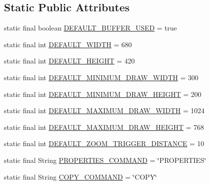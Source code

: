 \subsection*{Static Public Attributes}
\begin{DoxyCompactItemize}
\item 
static final boolean \mbox{\hyperlink{classorg_1_1jfree_1_1chart_1_1_chart_panel_a74df60f4b942e14630c514902daa1abd}{D\+E\+F\+A\+U\+L\+T\+\_\+\+B\+U\+F\+F\+E\+R\+\_\+\+U\+S\+ED}} = true
\item 
static final int \mbox{\hyperlink{classorg_1_1jfree_1_1chart_1_1_chart_panel_a5860f546e5e6898dbf0846a302a6fce2}{D\+E\+F\+A\+U\+L\+T\+\_\+\+W\+I\+D\+TH}} = 680
\item 
static final int \mbox{\hyperlink{classorg_1_1jfree_1_1chart_1_1_chart_panel_aa4098f5aead00c9f8f0abcedcc083cc4}{D\+E\+F\+A\+U\+L\+T\+\_\+\+H\+E\+I\+G\+HT}} = 420
\item 
static final int \mbox{\hyperlink{classorg_1_1jfree_1_1chart_1_1_chart_panel_a01b722cd1ce1b9750355443efa413ff7}{D\+E\+F\+A\+U\+L\+T\+\_\+\+M\+I\+N\+I\+M\+U\+M\+\_\+\+D\+R\+A\+W\+\_\+\+W\+I\+D\+TH}} = 300
\item 
static final int \mbox{\hyperlink{classorg_1_1jfree_1_1chart_1_1_chart_panel_ab196e6c1a9f56d89af726bae5b39fce0}{D\+E\+F\+A\+U\+L\+T\+\_\+\+M\+I\+N\+I\+M\+U\+M\+\_\+\+D\+R\+A\+W\+\_\+\+H\+E\+I\+G\+HT}} = 200
\item 
static final int \mbox{\hyperlink{classorg_1_1jfree_1_1chart_1_1_chart_panel_a36f6a5b02367e500ee3a2bad8eb6d1ce}{D\+E\+F\+A\+U\+L\+T\+\_\+\+M\+A\+X\+I\+M\+U\+M\+\_\+\+D\+R\+A\+W\+\_\+\+W\+I\+D\+TH}} = 1024
\item 
static final int \mbox{\hyperlink{classorg_1_1jfree_1_1chart_1_1_chart_panel_aa62fae8c6f323116f35fbbb841d849ab}{D\+E\+F\+A\+U\+L\+T\+\_\+\+M\+A\+X\+I\+M\+U\+M\+\_\+\+D\+R\+A\+W\+\_\+\+H\+E\+I\+G\+HT}} = 768
\item 
static final int \mbox{\hyperlink{classorg_1_1jfree_1_1chart_1_1_chart_panel_a8572972826ebc03b3eb70146282b6a3d}{D\+E\+F\+A\+U\+L\+T\+\_\+\+Z\+O\+O\+M\+\_\+\+T\+R\+I\+G\+G\+E\+R\+\_\+\+D\+I\+S\+T\+A\+N\+CE}} = 10
\item 
static final String \mbox{\hyperlink{classorg_1_1jfree_1_1chart_1_1_chart_panel_a48acce3b5ef971748c8b3bfefa2b5944}{P\+R\+O\+P\+E\+R\+T\+I\+E\+S\+\_\+\+C\+O\+M\+M\+A\+ND}} = \char`\"{}P\+R\+O\+P\+E\+R\+T\+I\+ES\char`\"{}
\item 
static final String \mbox{\hyperlink{classorg_1_1jfree_1_1chart_1_1_chart_panel_aadc71bcb5f92b57b0a701f0c2941ee94}{C\+O\+P\+Y\+\_\+\+C\+O\+M\+M\+A\+ND}} = \char`\"{}C\+O\+PY\char`\"{}

\end{DoxyCompactItemize}
